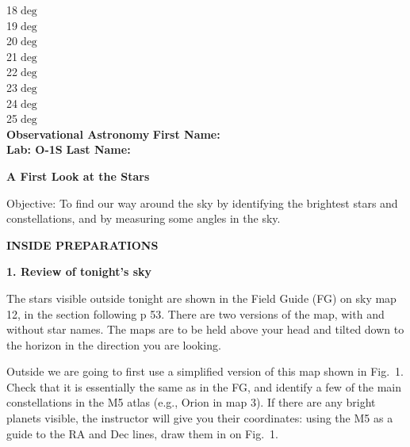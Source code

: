 \documentclass[12pt]{article}
\begin{document}
{\hfill 18$\deg$\makebox[2cm]{\hrulefill} \\
\vspace{-0.028cm}
\hfill 19$\deg$\makebox[2cm]{\hrulefill} \\
\vspace{-0.028cm}
\hfill 20$\deg$\makebox[2cm]{\hrulefill} \\
\vspace{-0.028cm}
\hfill 21$\deg$\makebox[2cm]{\hrulefill} \\
\vspace{-0.028cm}
\hfill 22$\deg$\makebox[2cm]{\hrulefill} \\
\vspace{-0.028cm}
\hfill 23$\deg$\makebox[2cm]{\hrulefill} \\
\vspace{-0.028cm}
\hfill 24$\deg$\makebox[2cm]{\hrulefill} \\
\vspace{-0.028cm}
\hfill 25$\deg$\makebox[2cm]{\hrulefill} \\
}
\noindent
{\bf Observational Astronomy    \hfill} {\bf First Name:\makebox[4cm]{\hrulefill}}\\
{\bf Lab: O-1S} \hfill {\bf Last Name:\makebox[4cm]{\hrulefill}}


\bigskip

\medskip

\noindent
{\hfill \Large {\bf A First Look at the Stars} \hfill}


\bigskip

\noindent
{Objective:} To find our way around the sky by identifying the
brightest stars and constellations, and by measuring some angles
in the sky.

\bigskip\noindent
{\bf INSIDE PREPARATIONS}
\bigskip

\noindent
{\bf 1. Review of tonight's sky}

\medskip
\noindent
The stars visible outside tonight are shown in the Field Guide (FG) on
sky map 12, in the section following p 53. There are two versions of
the map, with and without star names. The maps are to be held above
your head and tilted down to the horizon in the direction you are
looking.

Outside we are going to first use a simplified version of this map
shown in Fig.~1. Check that it is essentially the same as in the FG,
and identify a few of the main constellations in the M5 atlas (e.g.,
Orion in map 3). If there are any bright planets visible, the instructor
will give you their coordinates: using the M5 as a guide to the RA and
Dec lines, draw them in on Fig.~1.
\end{document}
